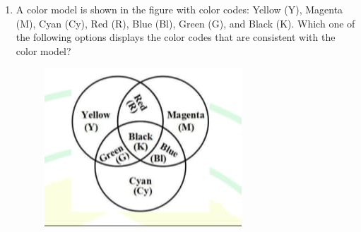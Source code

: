 \documentclass[journal,12pt,onecolumn]{article}
\theoremstyle{remark}
\begin{document}
\begin{enumerate}
\item A color model is shown in the figure  with color codes: Yellow (Y), Magenta (M), Cyan (Cy), Red (R), Blue (Bl), Green (G), and Black (K). Which one of the following options displays the color codes that are consistent with the color model?
\begin{figure}[H]
    \centering
    \includegraphics[width=0.4\columnwidth]{figs/1q-8.jpg}
    \caption{}
    \label{fig:q8}
\end{figure}


\end{enumerate}
\end{document}
